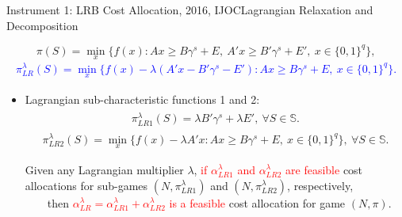 \documentclass[14pt]{beamer}
\begin{document}
\begin{frame}{Instrument 1: LRB Cost Allocation, {\footnotesize 2016, IJOC}}{Lagrangian Relaxation and Decomposition}
\footnotesize
\vspace{-4mm}
\begin{shaded}
\begin{equation*}\label{eqn:orgc}
\pi(S) = \min_{x} \big\{ f(x):Ax \geq B\gamma^s + E, ~A'x \geq B'\gamma^s + E', ~x \in \{0,1\}^{q} \big\},
\end{equation*}
\vspace{-5mm}
\textcolor{blue}{
\begin{eqnarray*}
\pi_{LR}^{\lambda}(S) = \min_{x}  \{f(x)-\lambda (A'x - B'\gamma^s - E'):
       Ax \geq B\gamma^s + E, ~x \in \{0,1\}^{q}\}.
\end{eqnarray*}
}
\vspace{-5mm}
\end{shaded}
\begin{itemize}
\footnotesize
\item Lagrangian sub-characteristic functions 1 and 2:
\begin{eqnarray*}\label{eqn:subcf1}
\begin{aligned}
\pi_{LR1}^{\lambda}(S) = \lambda  B'\gamma^s + \lambda E', ~\forall S \in \mathbb{S}.
\end{aligned}
\end{eqnarray*}
 \begin{eqnarray*}
\pi_{LR2}^{\lambda}(S) = \min_x \{ f(x)-\lambda A'x: Ax \geq B\gamma^s + E, ~x \in \{0,1\}^{q} \}, ~\forall S \in \mathbb{S}.
\end{eqnarray*}
\vspace{-1em}
\begin{theorem}\label{thm:lrcostallocationfeasible}
\justifying
\rm{
Given any Lagrangian multiplier $\lambda$, \textcolor{red}{if $\alpha_{LR1}^{\lambda}$ and $\alpha_{LR2}^{\lambda}$ are feasible} cost allocations for sub-games $(N,\pi_{LR1}^{\lambda})$ and $(N,\pi_{LR2}^{\lambda})$, respectively,\\
\vspace{3mm}
~~~~then \textcolor{red}{$\alpha_{LR}^{\lambda} = \alpha_{LR1}^{\lambda} + \alpha_{LR2}^{\lambda}$ is a feasible} cost allocation for game $(N,\pi)$.}
\end{theorem}
\end{itemize}
\end{frame}
\end{document}
